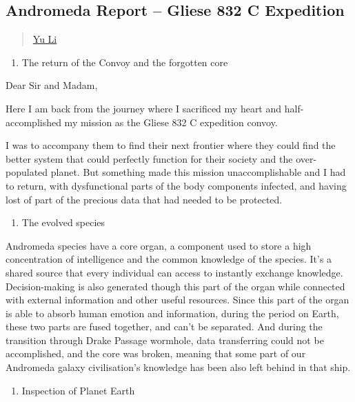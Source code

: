 \subsection{Andromeda Report -- Gliese 832 C
Expedition}\label{andromeda-report}

\begin{quote}
\hyperlink{yu-li}{Yu Li}
\end{quote}

\begin{enumerate}
\def\labelenumi{\arabic{enumi}.}
\tightlist
\item
  The return of the Convoy and the forgotten core
\end{enumerate}

Dear Sir and Madam,

Here I am back from the journey where I sacrificed my heart and
half-accomplished my mission as the Gliese 832 C expedition convoy.

I was to accompany them to find their next frontier where they could
find the better system that could perfectly function for their society
and the over-populated planet. But something made this mission
unaccomplishable and I had to return, with dysfunctional parts of the
body components infected, and having lost of part of the precious data
that had needed to be protected.

\begin{enumerate}
\def\labelenumi{\arabic{enumi}.}
\setcounter{enumi}{1}
\tightlist
\item
  The evolved species
\end{enumerate}

Andromeda species have a core organ, a component used to store a high
concentration of intelligence and the common knowledge of the species.
It's a shared source that every individual can access to instantly
exchange knowledge. Decision-making is also generated though this part
of the organ while connected with external information and other useful
resources. Since this part of the organ is able to absorb human emotion
and information, during the period on Earth, these two parts are fused
together, and can't be separated. And during the transition through
Drake Passage wormhole, data transferring could not be accomplished, and
the core was broken, meaning that some part of our Andromeda galaxy
civilisation's knowledge has been also left behind in that ship.

\begin{enumerate}
\def\labelenumi{\arabic{enumi}.}
\setcounter{enumi}{2}
\tightlist
\item
  Inspection of Planet Earth
\end{enumerate}

